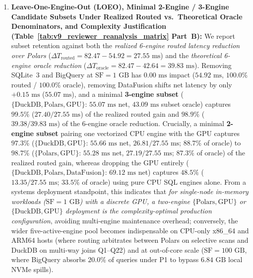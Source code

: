 \documentclass[10pt,a4paper]{article}
\begin{document}
\begin{enumerate}[leftmargin=1.5em,itemsep=0.8pt]
    \item \textbf{Leave-One-Engine-Out (LOEO), Minimal 2-Engine / 3-Engine Candidate Subsets Under Realized Routed vs.\ Theoretical Oracle Denominators, and Complexity Justification (Table~\ref{tab:v9_reviewer_reanalysis_matrix} Part~B):} We report subset retention against both the \emph{realized 6-engine routed latency reduction over Polars} ($\Delta T_{\text{routed}} = 82.47 - 54.92 = 27.55\text{ ms}$) and the \emph{theoretical 6-engine oracle reduction} ($\Delta T_{\text{oracle}} = 82.47 - 42.64 = 39.83\text{ ms}$). Removing SQLite~3 and BigQuery at $\text{SF}=1\text{ GB}$ has $0.00\text{ ms}$ impact ($54.92\text{ ms}$, $100.0\%$ routed / $100.0\%$ oracle), removing DataFusion shifts net latency by only $+0.15\text{ ms}$ ($55.07\text{ ms}$), and a minimal \textbf{3-engine subset} ($\{\text{DuckDB}, \text{Polars}, \text{GPU}\}$: $55.07\text{ ms}$ net, $43.09\text{ ms}$ subset oracle) captures $\mathbf{99.5\%}$ ($27.40/27.55\text{ ms}$) of the realized routed gain and $\mathbf{98.9\%}$ ($39.38/39.83\text{ ms}$) of the 6-engine oracle reduction. Crucially, a minimal \textbf{2-engine subset} pairing one vectorized CPU engine with the GPU captures $\mathbf{97.3\%}$ ($\{\text{DuckDB}, \text{GPU}\}$: $55.66\text{ ms}$ net, $26.81/27.55\text{ ms}$; $\mathbf{88.7\%}$ of oracle) to $\mathbf{98.7\%}$ ($\{\text{Polars}, \text{GPU}\}$: $55.28\text{ ms}$ net, $27.19/27.55\text{ ms}$; $\mathbf{87.3\%}$ of oracle) of the realized routed gain, whereas dropping the GPU entirely ($\{\text{DuckDB}, \text{Polars}, \text{DataFusion}\}$: $69.12\text{ ms}$ net) captures $\mathbf{48.5\%}$ ($13.35/27.55\text{ ms}$; $\mathbf{33.5\%}$ of oracle) using pure CPU SQL engines alone. From a systems deployment standpoint, this indicates that \emph{for single-node in-memory workloads ($\text{SF}=1\text{ GB}$) with a discrete GPU, a two-engine $\{\text{Polars}, \text{GPU}\}$ or $\{\text{DuckDB}, \text{GPU}\}$ deployment is the complexity-optimal production configuration}, avoiding multi-engine maintenance overhead; conversely, the wider five-active-engine pool becomes indispensable on CPU-only x86\_64 and ARM64 hosts (where routing arbitrates between Polars on selective scans and DuckDB on multi-way joins Q1--Q22) and at out-of-core scale ($\text{SF}=100\text{ GB}$, where BigQuery absorbs $20.0\%$ of queries under P1 to bypass $6.84\text{ GB}$ local NVMe spills).

\end{enumerate}
\end{document}
